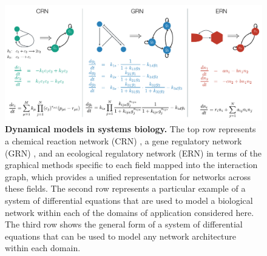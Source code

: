
\begin{figure}[!ht]
\centering
\noindent\includegraphics[width=0.9\columnwidth]{fig/biomodelexamples.pdf}
\caption{{\bf Dynamical models in systems biology.} The top row represents a chemical reaction network (CRN) \cite{Shinar2010}, a gene regulatory network (GRN) \cite{Karlebach2008}, and an ecological regulatory network (ERN) \cite{Rohr2014} in terms of the graphical methods specific to each field mapped into the interaction graph, which provides a unified representation for networks across these fields. The second row represents a particular example of a system of differential equations that are used to model a biological network within each of the domains of application considered here. The third row shows the general form of a system of differential equations that can be used to model any network architecture within each domain.}
\label{fig:biomodelexamples}
\end{figure}

\pagebreak

